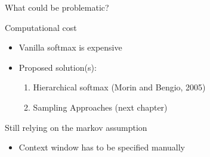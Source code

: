 
\begin{frame}{What could be problematic?}

\vfill

\begin{block}{Computational cost}
    \begin{itemize}
        \item Vanilla softmax is expensive
        \item Proposed solution(s): 
        \begin{enumerate}
            \item Hierarchical softmax (Morin and Bengio, 2005)
            \item Sampling Approaches (next chapter)
        \end{enumerate}
    \end{itemize}
\end{block}
\begin{block}{Still relying on the markov assumption}
    \begin{itemize}
        \item Context window has to be specified manually
    \end{itemize}
\end{block}

\vfill

\end{frame}


\endlecture

